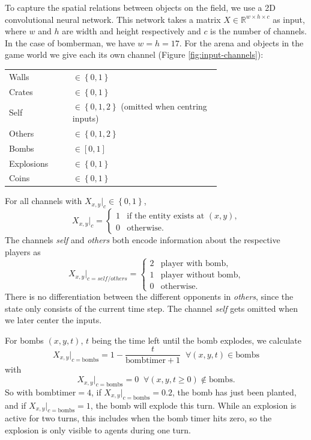 

To capture the spatial relations between objects on the field, we use a 2D convolutional neural network. This network takes a matrix $X\in\mathbb{R}^{w\times h \times c} $ as input, where $w$ and $h$ are width and height respectively and $c$ is the number of channels. In the case of bomberman, we have $w=h=17$. For the arena and objects in the game world we give each its own channel (Figure \ref{fig:input-channels}):\vspace{8pt}

\begin{tabular}{l p{0.7\linewidth}}
Walls & $\in\left\{0,1\right\}$ \\
Crates & $\in\left\{0,1\right\}$ \\
Self & $\in\left\{0,1,2\right\}$ (omitted when centring inputs)\\
Others & $\in\left\{0,1,2\right\}$\\
Bombs & $\in\left[0, 1\right]$ \\
Explosions & $\in\left\{0,1\right\}$ \\
Coins& $\in\left\{0,1\right\}$ \\
\end{tabular}

\vspace{8pt}
For all channels with $X_{x, y}|_c\in\left\{0, 1\right\}$, $$X_{x, y}|_c=\begin{cases}
1 & \text{if the entity exists at $(x, y)$,} \\
0 & \text{otherwise.}
\end{cases}$$
The channels \emph{self} and \emph{others} both encode information about the respective players as
$$X_{x,y}|_{c=self/others}=\begin{cases}
2 & \text{player with bomb,} \\
1 & \text{player without bomb,} \\
0 & \text{otherwise.}
\end{cases}
$$
There is no differentiation between the different opponents in \emph{others}, since the state only consists of the current time step. The channel \emph{self} gets omitted when we later center the inputs.

For bombs $(x, y, t)$, $t$ being the time left until the bomb explodes, we calculate $$X_{x, y}|_{c=\text{bombs}} = 1 - \frac{t}{\mathrm{bombtimer}+1} \;\;\forall (x, y, t) \in \text{bombs}$$ with $$X_{x, y}|_{c=\text{bombs}}=0 \;\;\forall (x, y, t\geq0) \notin \text{bombs}.$$
So with $\text{bombtimer}=4$, if $X_{x, y}|_{c=\text{bombs}} = 0.2$, the bomb has just been planted, and if $X_{x, y}|_{c=\text{bombs}} = 1$, the bomb will explode this turn.
While an explosion is active for two turns, this includes when the bomb timer hits zero, so the explosion is only visible to agents during one turn.




